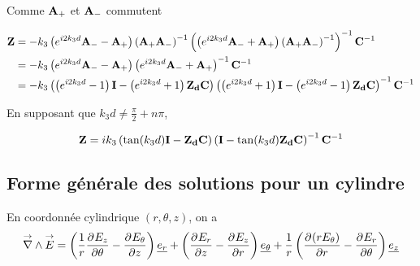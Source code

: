 Comme $\mA_+$ et $\mA_-$ commutent

\begin{align}
    \mat{Z} &=-k_3\left( e^{i2 k_3 d} \mA_- -  \mA_+\right)\left(\mA_+\mA_-\right)^{-1}
    \left(\left( e^{i2 k_3 d} \mA_- + \mA_+ \right)\left(\mA_+\mA_-\right)^{-1}\right)^{-1}\mC^{-1}
    \\
    &= -k_3\left( e^{i2 k_3 d} \mA_- -  \mA_+\right)
    \left( e^{i2 k_3 d} \mA_- + \mA_+ \right)^{-1}\mC^{-1}
    \\
    &= -k_3\left(\left( e^{i2 k_3 d} - 1 \right)\mI - \left( e^{i2 k_3 d} + 1 \right) \mat{Z_d}\mC \right)
    \left( \left( e^{i2 k_3 d} + 1 \right)\mI - \left( e^{i2 k_3 d} - 1 \right)\mat{Z_d}\mC \right)^{-1}\mC^{-1}   
\end{align}

En supposant que $k_3d\not = \frac{\pi}{2}+n\pi$, 

\begin{equation}
\mZ = ik_3\left(\tan(k_3 d)\mI - \mat{Z_d}\mC \right)
    \left( \mI - \tan(k_3 d)\mat{Z_d}\mC \right)^{-1}\mC^{-1} 
\end{equation}








\subsection{Forme générale des solutions pour un cylindre}

\newcommand{\mr}{r}
\newcommand{\mt}{\theta}
\newcommand{\mz}{z}

\begin{figure}[!htb]
    \centering
    \begin{tikzpicture}
        
    \end{tikzpicture}
\end{figure}



En coordonnée cylindrique $(r,\theta,z)$, on a
\begin{equation}
    \vrot \vE = \left(\frac{1}{r}\ddr{\theta}{E_z} - \ddr{z}{E_\theta}\right)\v{e_r} + 
    \left(\ddr{z}{E_r} - \ddr{r}{E_z}\right)\v{e_\theta} +
    \frac{1}{r}\left(\ddr{r}{(rE_\theta)}-\ddr{\theta}{E_r}\right)\v{e_z}
\end{equation}

